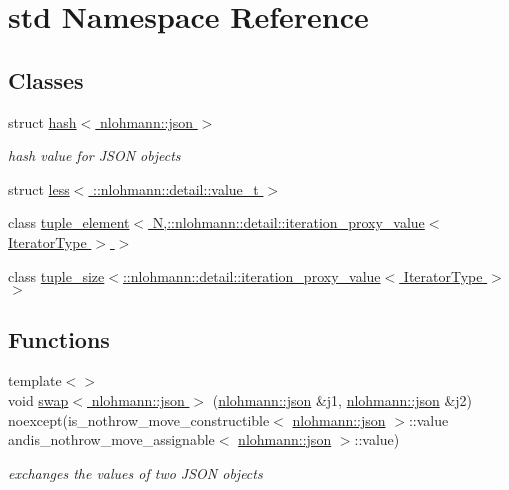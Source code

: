 \hypertarget{namespacestd}{}\section{std Namespace Reference}
\label{namespacestd}
\subsection*{Classes}
\begin{DoxyCompactItemize}
\item 
struct \hyperlink{structstd_1_1hash_3_01nlohmann_1_1json_01_4}{hash$<$ nlohmann\+::json $>$}
\begin{DoxyCompactList}\small\item\em hash value for J\+S\+ON objects \end{DoxyCompactList}\item 
struct \hyperlink{structstd_1_1less_3_01_1_1nlohmann_1_1detail_1_1value__t_01_4}{less$<$ \+::nlohmann\+::detail\+::value\+\_\+t $>$}
\item 
class \hyperlink{classstd_1_1tuple__element_3_01_n_00_1_1nlohmann_1_1detail_1_1iteration__proxy__value_3_01_iterator_type_01_4_01_4}{tuple\+\_\+element$<$ N,\+::nlohmann\+::detail\+::iteration\+\_\+proxy\+\_\+value$<$ Iterator\+Type $>$ $>$}
\item 
class \hyperlink{classstd_1_1tuple__size_3_1_1nlohmann_1_1detail_1_1iteration__proxy__value_3_01_iterator_type_01_4_01_4}{tuple\+\_\+size$<$\+::nlohmann\+::detail\+::iteration\+\_\+proxy\+\_\+value$<$ Iterator\+Type $>$ $>$}
\end{DoxyCompactItemize}
\subsection*{Functions}
\begin{DoxyCompactItemize}
\item 
{\footnotesize template$<$$>$ }\\void \hyperlink{namespacestd_ab4f43540e0db65133946d7021aff0109}{swap$<$ nlohmann\+::json $>$} (\hyperlink{namespacenlohmann_a2bfd99e845a2e5cd90aeaf1b1431f474}{nlohmann\+::json} \&j1, \hyperlink{namespacenlohmann_a2bfd99e845a2e5cd90aeaf1b1431f474}{nlohmann\+::json} \&j2) noexcept(is\+\_\+nothrow\+\_\+move\+\_\+constructible$<$ \hyperlink{namespacenlohmann_a2bfd99e845a2e5cd90aeaf1b1431f474}{nlohmann\+::json} $>$\+::value andis\+\_\+nothrow\+\_\+move\+\_\+assignable$<$ \hyperlink{namespacenlohmann_a2bfd99e845a2e5cd90aeaf1b1431f474}{nlohmann\+::json} $>$\+::value)
\begin{DoxyCompactList}\small\item\em exchanges the values of two J\+S\+ON objects \end{DoxyCompactList}\end{DoxyCompactItemize}


